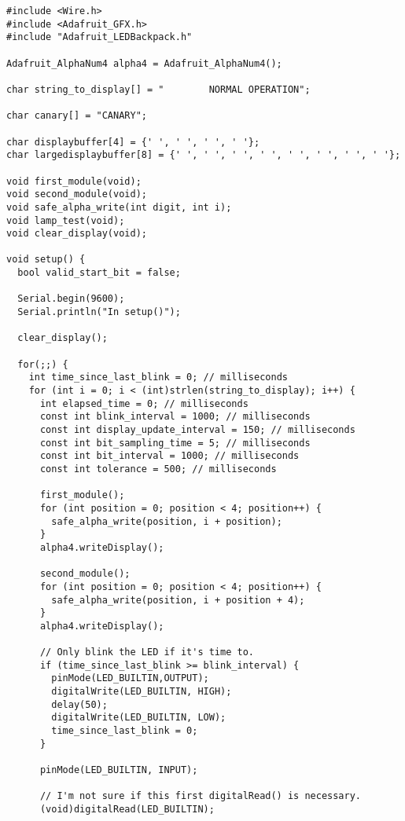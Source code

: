 \documentclass[a4paper,notitlepage]{article}
\begin{document}
\begin{verbatim}
#include <Wire.h>
#include <Adafruit_GFX.h>
#include "Adafruit_LEDBackpack.h"

Adafruit_AlphaNum4 alpha4 = Adafruit_AlphaNum4();

char string_to_display[] = "        NORMAL OPERATION";

char canary[] = "CANARY";

char displaybuffer[4] = {' ', ' ', ' ', ' '};
char largedisplaybuffer[8] = {' ', ' ', ' ', ' ', ' ', ' ', ' ', ' '};

void first_module(void);
void second_module(void);
void safe_alpha_write(int digit, int i);
void lamp_test(void);
void clear_display(void);

void setup() {
  bool valid_start_bit = false;

  Serial.begin(9600);
  Serial.println("In setup()");

  clear_display();

  for(;;) {
    int time_since_last_blink = 0; // milliseconds
    for (int i = 0; i < (int)strlen(string_to_display); i++) {
      int elapsed_time = 0; // milliseconds
      const int blink_interval = 1000; // milliseconds
      const int display_update_interval = 150; // milliseconds
      const int bit_sampling_time = 5; // milliseconds
      const int bit_interval = 1000; // milliseconds
      const int tolerance = 500; // milliseconds

      first_module();
      for (int position = 0; position < 4; position++) {
        safe_alpha_write(position, i + position);
      }
      alpha4.writeDisplay();

      second_module();
      for (int position = 0; position < 4; position++) {
        safe_alpha_write(position, i + position + 4);
      }
      alpha4.writeDisplay();

      // Only blink the LED if it's time to.
      if (time_since_last_blink >= blink_interval) {
        pinMode(LED_BUILTIN,OUTPUT);
        digitalWrite(LED_BUILTIN, HIGH);
        delay(50);
        digitalWrite(LED_BUILTIN, LOW);
        time_since_last_blink = 0;
      }

      pinMode(LED_BUILTIN, INPUT);

      // I'm not sure if this first digitalRead() is necessary.
      (void)digitalRead(LED_BUILTIN);


\end{verbatim}
\end{document}
